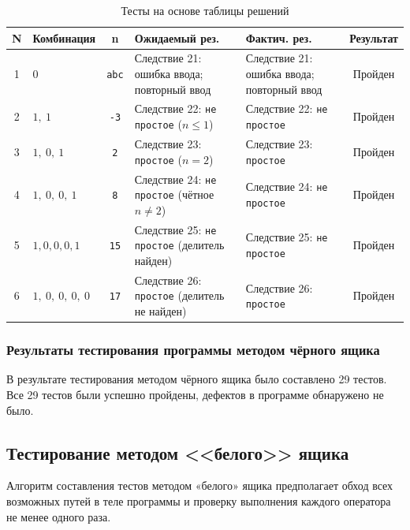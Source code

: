\documentclass{article}[14pt]
\begin{document}
\begin{table}[H]
\centering
\caption{Тесты на основе таблицы решений}
\renewcommand{\arraystretch}{1.5}
\begin{tabular}{|c|p{4.2cm}|c|p{3.5cm}|p{3.5cm}|c|}
\hline
\textbf{N} & \textbf{Комбинация} & \textbf{n} & \textbf{Ожидаемый рез.} & \textbf{Фактич. рез.} & \textbf{Результат} \\
\hline
1 &
$0$ &
\texttt{abc} &
Следствие 21: ошибка ввода; повторный ввод &
Следствие 21: ошибка ввода; повторный ввод &
Пройден \\
\hline
2 &
$1,\ 1$ &
\texttt{-3} &
Следствие 22: \texttt{не простое} ($n \leq 1$) &
Следствие 22: \texttt{не простое} &
Пройден \\
\hline
3 &
$1,\ 0,\ 1$ &
\texttt{2} &
Следствие 23: \texttt{простое} ($n = 2$) &
Следствие 23: \texttt{простое} &
Пройден \\
\hline
4 &
$1,\ 0,\ 0,\ 1$ &
\texttt{8} &
Следствие 24: \texttt{не простое} (чётное $n \neq 2$) &
Следствие 24: \texttt{не простое} &
Пройден \\
\hline
5 &
$1, 0, 0, 0, 1$ &
\texttt{15} &
Следствие 25: \texttt{не простое} (делитель найден) &
Следствие 25: \texttt{не простое} &
Пройден \\
\hline
6 &
$1,\ 0,\ 0,\ 0,\ 0$ &
\texttt{17} &
Следствие 26: \texttt{простое} (делитель не найден) &
Следствие 26: \texttt{простое} &
Пройден \\
\hline
\end{tabular}
\end{table}

\subsubsection{Результаты тестирования программы методом чёрного ящика}

В результате тестирования методом чёрного ящика было составлено 29 тестов. Все 29 тестов были успешно пройдены, дефектов
в программе обнаружено не было.

\subsection{Тестирование методом <<белого>> ящика}

Алгоритм составления тестов методом «белого» ящика предполагает обход всех возможных путей
в теле программы и проверку выполнения каждого оператора не менее одного раза.
\end{document}
